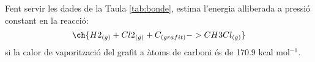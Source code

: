 \begin{exr}
Fent servir les dades de la Taula \ref{tab:bonde}, estima l'energia alliberada a pressió constant en la reacció:
\[
\ch{H2_{(g)}+Cl2_{(g)} + C_{(grafit)} -> CH3Cl_{(g)}}
\]
si la calor de vaporització del grafit a àtoms de carboni és de 170.9 kcal mol$^{-1}$.
\end{exr}
